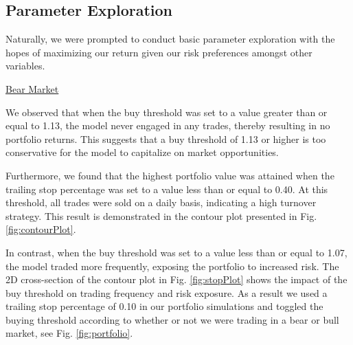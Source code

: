 \documentclass{article}
\begin{document}
\subsection{Parameter Exploration}
Naturally, we were prompted to conduct basic parameter exploration with the hopes of maximizing our return given our risk preferences amongst other variables.

\underline{Bear Market}

We observed that when the buy threshold was set to a value greater than or equal to 1.13, the model never engaged in any trades, thereby resulting in no portfolio returns. This suggests that a buy threshold of 1.13 or higher is too conservative for the model to capitalize on market opportunities.

Furthermore, we found that the highest portfolio value was attained when the trailing stop percentage was set to a value less than or equal to 0.40. At this threshold, all trades were sold on a daily basis, indicating a high turnover strategy. This result is demonstrated in the contour plot presented in Fig. \ref{fig:contourPlot}.

In contrast, when the buy threshold was set to a value less than or equal to 1.07, the model traded more frequently, exposing the portfolio to increased risk. The 2D cross-section of the contour plot in Fig. \ref{fig:stopPlot} shows the impact of the buy threshold on trading frequency and risk exposure. As a result we used a trailing stop percentage of 0.10 in our portfolio simulations and toggled the buying threshold according to whether or not we were trading in a bear or bull market, see Fig. \ref{fig:portfolio}.
\end{document}
